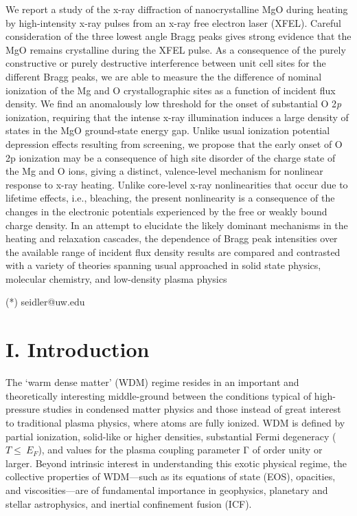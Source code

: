 \begin{addmargin}[4em]{1em}
We report a study of the x-ray diffraction of nanocrystalline MgO during
heating by high-intensity x-ray pulses from an x-ray free electron laser
(XFEL). Careful consideration of the three lowest angle Bragg peaks
gives strong evidence that the MgO remains crystalline during the XFEL
pulse. As a consequence of the purely constructive or purely destructive
interference between unit cell sites for the different Bragg peaks, we
are able to measure the the difference of nominal ionization of the Mg
and O crystallographic sites as a function of incident flux density. We
find an anomalously low threshold for the onset of substantial O
2\emph{p} ionization, requiring that the intense x-ray illumination
induces a large density of states in the MgO ground-state energy gap.
Unlike usual ionization potential depression effects resulting from
screening, we propose that the early onset of O 2p ionization may be a
consequence of high site disorder of the charge state of the Mg and O
ions, giving a distinct, valence-level mechanism for nonlinear response
to x-ray heating. Unlike core-level x-ray nonlinearities that occur due
to lifetime effects, i.e., bleaching, the present nonlinearity is a
consequence of the changes in the electronic potentials experienced by
the free or weakly bound charge density. In an attempt to elucidate the
likely dominant mechanisms in the heating and relaxation cascades, the
dependence of Bragg peak intensities over the available range of
incident flux density results are compared and contrasted with a variety
of theories spanning usual approached in solid state physics, molecular
chemistry, and low-density plasma physics
\end{addmargin}

(*) seidler@uw.edu

\section{I. Introduction}

The `warm dense matter' (WDM) regime resides in an important and
theoretically interesting middle-ground between the conditions typical
of high-pressure studies in condensed matter physics and those instead
of great interest to traditional plasma physics, where atoms are fully
ionized. WDM is defined by partial ionization, solid-like or higher
densities, substantial Fermi degeneracy (\(T \leq \ E_{F}\)), and values
for the plasma coupling parameter Γ of order unity or larger. \cite{KOENIG2005PROGRESS}
Beyond intrinsic interest in understanding this exotic physical regime,
the collective properties of WDM---such as its equations of state (EOS),
opacities, and viscosities---are of fundamental importance in
geophysics, planetary and stellar astrophysics, and inertial confinement
fusion (ICF). \cite{ATZENI2004PHYSICS}

